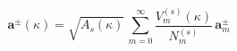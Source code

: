 \begin{equation}
\mathbf{a}^{\pm}(\kappa)=\sqrt{A_s(\kappa)}\,
\sum_{m=0}^{\infty} \frac{V_m^{(s)}(\kappa)}{N_m^{(s)}}\,
\mathbf{a}_m^{\pm}
\label{phipm}
\end{equation}

